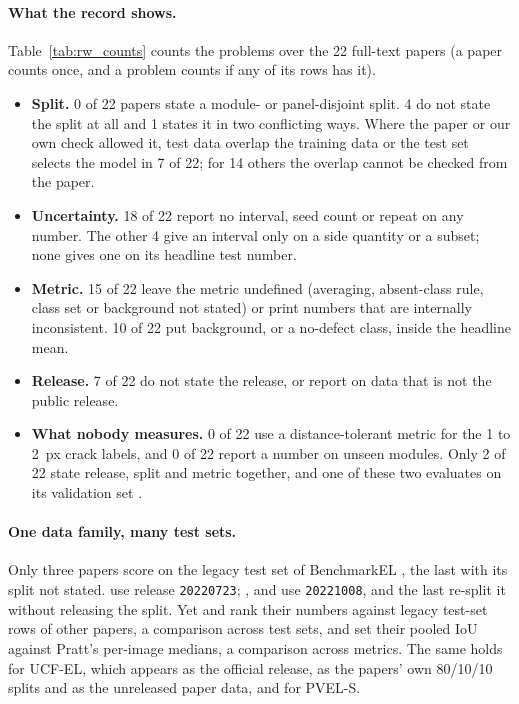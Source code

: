 \paragraph{What the record shows.} Table~\ref{tab:rw_counts} counts the problems over the 22 full-text papers (a paper counts
once, and a problem counts if any of its rows has it).
\begin{itemize}
  \item \textbf{Split.} 0 of 22 papers state a module- or panel-disjoint split. 4 do not state the split at all and 1 states
  it in two conflicting ways. Where the paper or our own check allowed it, test data overlap the training data or the test
  set selects the model in 7 of 22; for 14 others the overlap cannot be checked from the paper.
  \item \textbf{Uncertainty.} 18 of 22 report no interval, seed count or repeat on any number. The other 4 give an interval
  only on a side quantity or a subset; none gives one on its headline test number.
  \item \textbf{Metric.} 15 of 22 leave the metric undefined (averaging, absent-class rule, class set or background not
  stated) or print numbers that are internally inconsistent. 10 of 22 put background, or a no-defect class, inside the
  headline mean.
  \item \textbf{Release.} 7 of 22 do not state the release, or report on data that is not the public release.
  \item \textbf{What nobody measures.} 0 of 22 use a distance-tolerant metric for the 1 to 2~px crack labels, and 0 of 22
  report a number on unseen modules. Only 2 of 22 state release, split and metric together, and one of these two evaluates
  on its validation set \citep{duan2025caak}.
\end{itemize}

\paragraph{One data family, many test sets.} Only three papers score on the legacy test set of BenchmarkEL
\citep{pratt2023benchmark,eesaar2023seipv,jha2025pvs3}, the last with its split not stated. \citet{torpey2024pretraining} use
release \texttt{20220723}; \citet{mazen2024segnet}, \citet{ramadan2026hybrid} and \citet{hanifi2025multiclass} use
\texttt{20221008}, and the last re-split it without releasing the split. Yet \citet{mazen2024segnet} and
\citet{ramadan2026hybrid} rank their numbers against legacy test-set rows of other papers, a comparison across test sets, and
\citet{jha2025pvs3} set their pooled IoU against Pratt's per-image medians, a comparison across metrics. The same holds for
UCF-EL, which appears as the official release, as the papers' own 80/10/10 splits and as the unreleased paper data, and for
PVEL-S.

